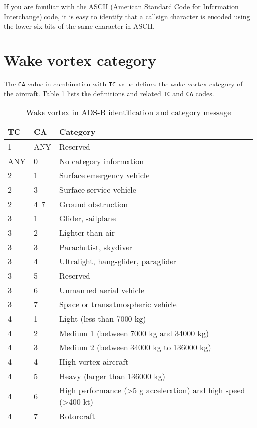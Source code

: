 If you are familiar with the ASCII (American Standard Code for Information Interchange) code, it is easy to identify that a callsign character is encoded using the lower six bits of the same character in ASCII.

\section{Wake vortex category}
The \texttt{CA} value in combination with \texttt{TC} value defines the wake vortex category of the aircraft. Table \ref{tb:adsb_id_wake_category} lists the definitions and related \texttt{TC} and \texttt{CA} codes.

\begin{table}[ht]
\caption{Wake vortex in ADS-B identification and category message}
\label{tb:adsb_id_wake_category}
\begin{tabular}{|l|l|l|}
\hline
\textbf{TC} & \textbf{CA} & \textbf{Category} \\ \hline\hline
1 & ANY & Reserved \\ \hline\hline
ANY & 0 & No category information \\ \hline\hline
2 & 1 & Surface emergency vehicle \\ \hline
2 & 3 & Surface service vehicle \\ \hline
2 & 4--7 & Ground obstruction \\ \hline\hline
3 & 1 & Glider, sailplane \\ \hline
3 & 2 & Lighter-than-air \\ \hline
3 & 3 & Parachutist, skydiver \\ \hline
3 & 4 & Ultralight, hang-glider, paraglider \\ \hline
3 & 5 & Reserved \\ \hline
3 & 6 & Unmanned aerial vehicle \\ \hline
3 & 7 & Space or transatmospheric vehicle \\ \hline\hline
4 & 1 & Light (less than 7000 kg) \\ \hline
4 & 2 & Medium 1 (between 7000 kg and 34000 kg) \\ \hline
4 & 3 & Medium 2 (between 34000 kg to 136000 kg) \\ \hline
4 & 4 & High vortex aircraft \\ \hline
4 & 5 & Heavy (larger than 136000 kg) \\ \hline
4 & 6 & High performance (\textgreater 5 g acceleration) and high speed (\textgreater 400 kt) \\ \hline
4 & 7 & Rotorcraft \\ \hline
\end{tabular}
\end{table}

